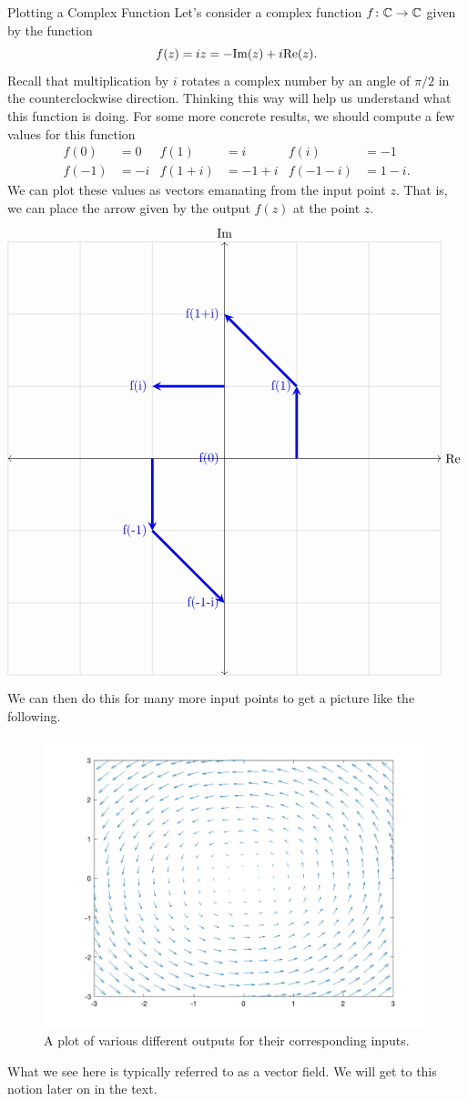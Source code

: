 \begin{ex}{Plotting a Complex Function}
	Let's consider a complex function $f\colon \mathbb{C} \to \mathbb{C}$ given by the function
	\[
		f(z) = iz= -\mathrm{Im}(z)+i\mathrm{Re}(z).
	\]
	Recall that multiplication by $i$ rotates a complex number by an angle of $\pi/2$ in the counterclockwise direction. Thinking this way will help us understand what this function is doing.  For some more concrete results, we should compute a few values for this function
	\begin{align*}
		f(0)&= 0 & f(1)&=i & f(i)&= -1\\
		f(-1)&= -i & f(1+i)&= -1+i & f(-1 -i) &= 1 - i.
	\end{align*}
	We can plot these values as vectors emanating from the input point $z$. That is, we can place the arrow given by the output $f(z)$ at the point $z$.  
	\[
	        \begin{tikzpicture}[scale=2]
	        \draw[thin,gray!40] (-3,-3) grid (3,3);
	        \draw[<->] (-3,0)--(3,0) node[right]{$\RE$};
	        \draw[<->] (0,-3)--(0,3) node[above]{$\IM$};
	        \draw[line width=2pt,blue,-](0,0)--(0,0) node[anchor=east] at (0,0){f(0)};
	        \draw[line width=2pt,blue,-stealth](1,0)--(1,1) node[anchor=east] at (1,1){f(1)};
	        \draw[line width=2pt,blue,-stealth](-1,0)--(-1,-1) node[anchor=east] at (-1,-1){f(-1)};
	        \draw[line width=2pt,blue,-stealth](0,1)--(-1,1) node[anchor=east] at (-1,1){f(i)};
	        \draw[line width=2pt,blue,-stealth](1,1)--(0,2) node[anchor=east] at (0,2){f(1+i)};
	        \draw[line width=2pt,blue,-stealth](-1,-1)--(0,-2) node[anchor=east] at (0,-2){f(-1-i)};
	        \end{tikzpicture}
	  \]
	  We can then do this for many more input points to get a picture like the following.
		\begin{figure}[H]
			\centering
			\includegraphics[width=\textwidth]{Figures_Part_5/complex_function_visual.png}
			\caption{A plot of various different outputs for their corresponding inputs.}
		\end{figure}
		What we see here is typically referred to as a vector field. We will get to this notion later on in the text.
\end{ex}
		
